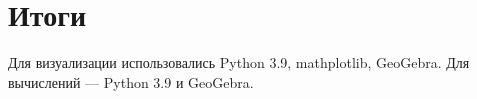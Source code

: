 \section{Итоги}



    Для визуализации использовались Python 3.9, mathplotlib, GeoGebra. Для вычислений --- Python 3.9 и GeoGebra.
